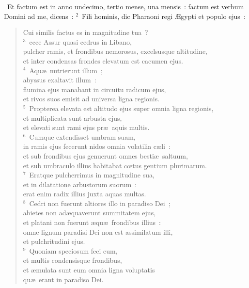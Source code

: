 ~Et factum est in anno undecimo, tertio mense, una mensis~: factum est verbum Domini ad me, dicens~:
${}^{2}$~Fili hominis, dic Pharaoni regi \AE gypti et populo ejus~: \begin{flushleft}\begin{verse}Cui similis factus es in magnitudine tua~?\\
${}^{3}$~ecce Assur quasi cedrus in Libano,\\ pulcher ramis, et frondibus nemorosus, excelsusque altitudine,\\ et inter condensas frondes elevatum est cacumen ejus.\\
${}^{4}$~Aqu\ae\ nutrierunt illum~;\\ abyssus exaltavit illum~:\\ flumina ejus manabant in circuitu radicum ejus,\\ et rivos suos emisit ad universa ligna regionis.\\
${}^{5}$~Propterea elevata est altitudo ejus super omnia ligna regionis,\\ et multiplicata sunt arbusta ejus,\\ et elevati sunt rami ejus pr\ae\ aquis multis.\\
${}^{6}$~Cumque extendisset umbram suam,\\ in ramis ejus fecerunt nidos omnia volatilia c\ae li~:\\ et sub frondibus ejus genuerunt omnes besti\ae\ saltuum,\\ et sub umbraculo illius habitabat cœtus gentium plurimarum.\\
${}^{7}$~Eratque pulcherrimus in magnitudine sua,\\ et in dilatatione arbustorum suorum~:\\ erat enim radix illius juxta aquas multas.\\
${}^{8}$~Cedri non fuerunt altiores illo in paradiso Dei~;\\ abietes non ad\ae quaverunt summitatem ejus,\\ et platani non fuerunt \ae qu\ae\ frondibus illius~:\\ omne lignum paradisi Dei non est assimilatum illi,\\ et pulchritudini ejus.\\
${}^{9}$~Quoniam speciosum feci eum,\\ et multis condensisque frondibus,\\ et \ae mulata sunt eum omnia ligna voluptatis\\ qu\ae\ erant in paradiso Dei.\end{verse}\end{flushleft}



